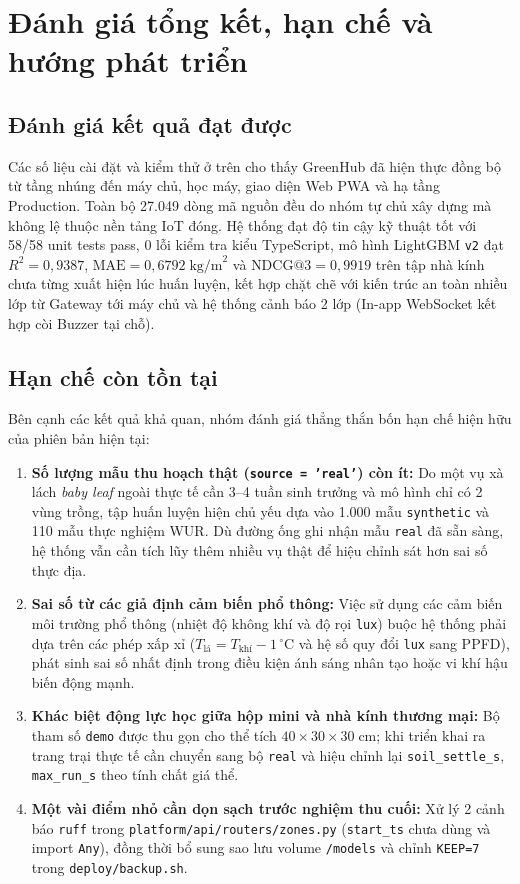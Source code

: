 \section{Đánh giá tổng kết, hạn chế và hướng phát triển}
\label{sec:c4-evaluation}

\subsection{Đánh giá kết quả đạt được}

Các số liệu cài đặt và kiểm thử ở trên cho thấy GreenHub đã hiện thực đồng bộ từ tầng nhúng đến máy chủ, học máy, giao diện Web PWA và hạ tầng Production. Toàn bộ 27.049 dòng mã nguồn đều do nhóm tự chủ xây dựng mà không lệ thuộc nền tảng IoT đóng. Hệ thống đạt độ tin cậy kỹ thuật tốt với 58/58 unit tests pass, 0 lỗi kiểm tra kiểu TypeScript, mô hình LightGBM \texttt{v2} đạt \(R^2 = 0{,}9387\), \(\text{MAE} = 0{,}6792\;\text{kg/m}^2\) và \(\text{NDCG@3} = 0{,}9919\) trên tập nhà kính chưa từng xuất hiện lúc huấn luyện, kết hợp chặt chẽ với kiến trúc an toàn nhiều lớp từ Gateway tới máy chủ và hệ thống cảnh báo 2 lớp (In-app WebSocket kết hợp còi Buzzer tại chỗ).

\subsection{Hạn chế còn tồn tại}

Bên cạnh các kết quả khả quan, nhóm đánh giá thẳng thắn bốn hạn chế hiện hữu của phiên bản hiện tại:
\begin{enumerate}[leftmargin=*]
    \item \textbf{Số lượng mẫu thu hoạch thật (\texttt{source = 'real'}) còn ít:} Do một vụ xà lách \textit{baby leaf} ngoài thực tế cần 3--4 tuần sinh trưởng và mô hình chỉ có 2 vùng trồng, tập huấn luyện hiện chủ yếu dựa vào 1.000 mẫu \texttt{synthetic} và 110 mẫu thực nghiệm WUR. Dù đường ống ghi nhận mẫu \texttt{real} đã sẵn sàng, hệ thống vẫn cần tích lũy thêm nhiều vụ thật để hiệu chỉnh sát hơn sai số thực địa.
    \item \textbf{Sai số từ các giả định cảm biến phổ thông:} Việc sử dụng các cảm biến môi trường phổ thông (nhiệt độ không khí và độ rọi \texttt{lux}) buộc hệ thống phải dựa trên các phép xấp xỉ (\(T_{\text{lá}} = T_{\text{khí}} - 1\,^\circ\text{C}\) và hệ số quy đổi \texttt{lux} sang PPFD), phát sinh sai số nhất định trong điều kiện ánh sáng nhân tạo hoặc vi khí hậu biến động mạnh.
    \item \textbf{Khác biệt động lực học giữa hộp mini và nhà kính thương mại:} Bộ tham số \texttt{demo} được thu gọn cho thể tích \(40 \times 30 \times 30\;\text{cm}\); khi triển khai ra trang trại thực tế cần chuyển sang bộ \texttt{real} và hiệu chỉnh lại \texttt{soil\_settle\_s}, \texttt{max\_run\_s} theo tính chất giá thể.
    \item \textbf{Một vài điểm nhỏ cần dọn sạch trước nghiệm thu cuối:} Xử lý 2 cảnh báo \texttt{ruff} trong \texttt{platform/api/routers/zones.py} (\texttt{start\_ts} chưa dùng và import \texttt{Any}), đồng thời bổ sung sao lưu volume \texttt{/models} và chỉnh \texttt{KEEP=7} trong \texttt{deploy/backup.sh}.
\end{enumerate}


